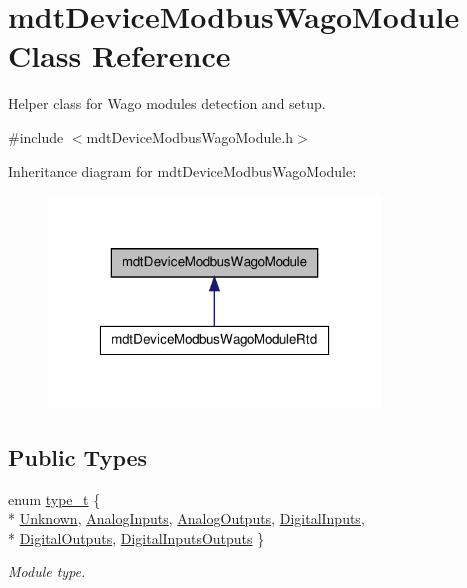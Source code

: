 \hypertarget{classmdt_device_modbus_wago_module}{\section{mdt\-Device\-Modbus\-Wago\-Module Class Reference}
\label{classmdt_device_modbus_wago_module}
}


Helper class for Wago modules detection and setup.  




{\ttfamily \#include $<$mdt\-Device\-Modbus\-Wago\-Module.\-h$>$}



Inheritance diagram for mdt\-Device\-Modbus\-Wago\-Module\-:\nopagebreak
\begin{figure}[H]
\begin{center}
\leavevmode
\includegraphics[width=250pt]{classmdt_device_modbus_wago_module__inherit__graph}
\end{center}
\end{figure}
\subsection*{Public Types}
\begin{DoxyCompactItemize}
\item 
enum \hyperlink{classmdt_device_modbus_wago_module_a2d8f6895b2a031c953bd91c2f65a1a25}{type\-\_\-t} \{ \\*
\hyperlink{classmdt_device_modbus_wago_module_a2d8f6895b2a031c953bd91c2f65a1a25aa195556cb75e827f16f81e9f09908660}{Unknown}, 
\hyperlink{classmdt_device_modbus_wago_module_a2d8f6895b2a031c953bd91c2f65a1a25a70609836e6ef603f912da6084adf3c9d}{Analog\-Inputs}, 
\hyperlink{classmdt_device_modbus_wago_module_a2d8f6895b2a031c953bd91c2f65a1a25a38c67b211155faa87f52767c60134f33}{Analog\-Outputs}, 
\hyperlink{classmdt_device_modbus_wago_module_a2d8f6895b2a031c953bd91c2f65a1a25aee246eb286603d48008177621980eda4}{Digital\-Inputs}, 
\\*
\hyperlink{classmdt_device_modbus_wago_module_a2d8f6895b2a031c953bd91c2f65a1a25ace992008f0003a8ee2106872b6a410a3}{Digital\-Outputs}, 
\hyperlink{classmdt_device_modbus_wago_module_a2d8f6895b2a031c953bd91c2f65a1a25adbe63d8313a77922b9a7808a5321fdb7}{Digital\-Inputs\-Outputs}
 \}
\begin{DoxyCompactList}\small\item\em Module type. \end{DoxyCompactList}\end{DoxyCompactItemize}
